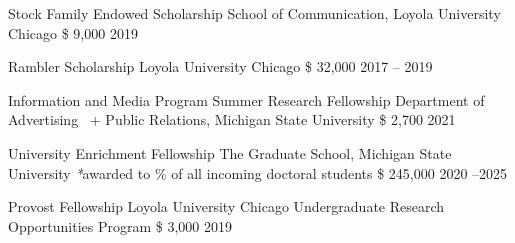 \begin{cvhonors}

  \cvhonor
    {Stock Family Endowed Scholarship} %
    {School of Communication, Loyola University Chicago} %
    {\$ 9,000} %
    {2019} %
\end{cvhonors}

\begin{cvhonors}

  \cvhonor
    {Rambler Scholarship} %
    { Loyola University Chicago
} %
    {\$ 32,000} %
    {2017 -- 2019} %
\end{cvhonors}


\begin{cvhonors}
  \cvhonor
    {Information and Media Program Summer Research Fellowship} 
    {Department of Advertising \ +  Public Relations,
    Michigan State University } 
    {\$ 2,700} 
    {2021} 

  \cvhonor
    {University Enrichment Fellowship} %
    {The Graduate School, Michigan State University \scriptsize{\textit{*}awarded to  \% of all incoming doctoral students}} %
    {\$ 245,000} %
    {2020 --2025} %
    
  \cvhonor
    {Provost Fellowship} 
    {Loyola University Chicago Undergraduate Research Opportunities Program } 
    {\$ 3,000} 
    {2019} 
\end{cvhonors}
